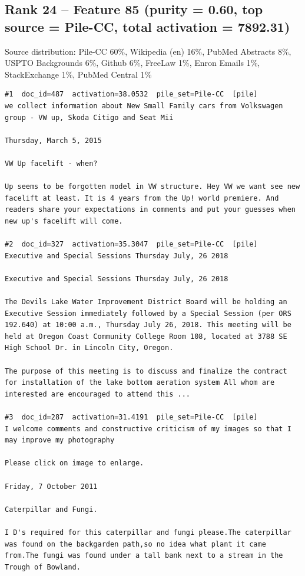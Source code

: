 \subsection*{Rank 24 -- Feature 85 (purity = 0.60, top source = Pile-CC, total activation = 7892.31)}

Source distribution: Pile-CC 60\%, Wikipedia (en) 16\%, PubMed Abstracts 8\%, USPTO Backgrounds 6\%, Github 6\%, FreeLaw 1\%, Enron Emails 1\%, StackExchange 1\%, PubMed Central 1\%

\begin{verbatim}
#1  doc_id=487  activation=38.0532  pile_set=Pile-CC  [pile]
we collect information about New Small Family cars from Volkswagen group - VW up, Skoda Citigo and Seat Mii

Thursday, March 5, 2015

VW Up facelift - when?

Up seems to be forgotten model in VW structure. Hey VW we want see new facelift at least. It is 4 years from the Up! world premiere. And readers share your expectations in comments and put your guesses when new up's facelift will come.

#2  doc_id=327  activation=35.3047  pile_set=Pile-CC  [pile]
Executive and Special Sessions Thursday July, 26 2018

Executive and Special Sessions Thursday July, 26 2018

The Devils Lake Water Improvement District Board will be holding an Executive Session immediately followed by a Special Session (per ORS 192.640) at 10:00 a.m., Thursday July 26, 2018. This meeting will be held at Oregon Coast Community College Room 108, located at 3788 SE High School Dr. in Lincoln City, Oregon.

The purpose of this meeting is to discuss and finalize the contract for installation of the lake bottom aeration system All whom are interested are encouraged to attend this ...

#3  doc_id=287  activation=31.4191  pile_set=Pile-CC  [pile]
I welcome comments and constructive criticism of my images so that I may improve my photography

Please click on image to enlarge.

Friday, 7 October 2011

Caterpillar and Fungi.

I D's required for this caterpillar and fungi please.The caterpillar was found on the backgarden path,so no idea what plant it came from.The fungi was found under a tall bank next to a stream in the Trough of Bowland.


\end{verbatim}
